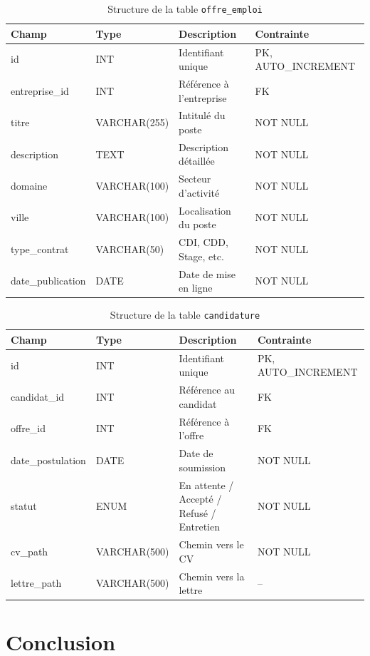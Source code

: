 \documentclass[12pt,a4paper]{report}
\begin{document}
\begin{table}[H]
\centering
\caption{Structure de la table \texttt{offre\_emploi}}
\begin{tabularx}{\textwidth}{llXl}
\toprule
\textbf{Champ} & \textbf{Type} & \textbf{Description} & \textbf{Contrainte} \\
\midrule
id & INT & Identifiant unique & PK, AUTO\_INCREMENT \\
entreprise\_id & INT & Référence à l'entreprise & FK \\
titre & VARCHAR(255) & Intitulé du poste & NOT NULL \\
description & TEXT & Description détaillée & NOT NULL \\
domaine & VARCHAR(100) & Secteur d'activité & NOT NULL \\
ville & VARCHAR(100) & Localisation du poste & NOT NULL \\
type\_contrat & VARCHAR(50) & CDI, CDD, Stage, etc. & NOT NULL \\
date\_publication & DATE & Date de mise en ligne & NOT NULL \\
\bottomrule
\end{tabularx}
\end{table}

\begin{table}[H]
\centering
\caption{Structure de la table \texttt{candidature}}
\begin{tabularx}{\textwidth}{llXl}
\toprule
\textbf{Champ} & \textbf{Type} & \textbf{Description} & \textbf{Contrainte} \\
\midrule
id & INT & Identifiant unique & PK, AUTO\_INCREMENT \\
candidat\_id & INT & Référence au candidat & FK \\
offre\_id & INT & Référence à l'offre & FK \\
date\_postulation & DATE & Date de soumission & NOT NULL \\
statut & ENUM & En attente / Accepté / Refusé / Entretien & NOT NULL \\
cv\_path & VARCHAR(500) & Chemin vers le CV & NOT NULL \\
lettre\_path & VARCHAR(500) & Chemin vers la lettre & -- \\
\bottomrule
\end{tabularx}
\end{table}

\section*{Conclusion}
\end{document}
